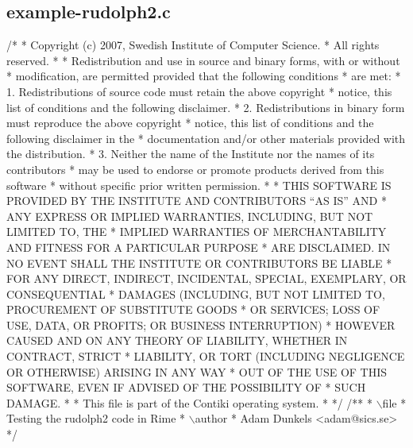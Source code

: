 \hypertarget{a00030}{}\subsection{example-\/rudolph2.\+c}

\begin{DoxyCodeInclude}
\textcolor{comment}{/*}
\textcolor{comment}{ * Copyright (c) 2007, Swedish Institute of Computer Science.}
\textcolor{comment}{ * All rights reserved.}
\textcolor{comment}{ *}
\textcolor{comment}{ * Redistribution and use in source and binary forms, with or without}
\textcolor{comment}{ * modification, are permitted provided that the following conditions}
\textcolor{comment}{ * are met:}
\textcolor{comment}{ * 1. Redistributions of source code must retain the above copyright}
\textcolor{comment}{ *    notice, this list of conditions and the following disclaimer.}
\textcolor{comment}{ * 2. Redistributions in binary form must reproduce the above copyright}
\textcolor{comment}{ *    notice, this list of conditions and the following disclaimer in the}
\textcolor{comment}{ *    documentation and/or other materials provided with the distribution.}
\textcolor{comment}{ * 3. Neither the name of the Institute nor the names of its contributors}
\textcolor{comment}{ *    may be used to endorse or promote products derived from this software}
\textcolor{comment}{ *    without specific prior written permission.}
\textcolor{comment}{ *}
\textcolor{comment}{ * THIS SOFTWARE IS PROVIDED BY THE INSTITUTE AND CONTRIBUTORS ``AS IS'' AND}
\textcolor{comment}{ * ANY EXPRESS OR IMPLIED WARRANTIES, INCLUDING, BUT NOT LIMITED TO, THE}
\textcolor{comment}{ * IMPLIED WARRANTIES OF MERCHANTABILITY AND FITNESS FOR A PARTICULAR PURPOSE}
\textcolor{comment}{ * ARE DISCLAIMED.  IN NO EVENT SHALL THE INSTITUTE OR CONTRIBUTORS BE LIABLE}
\textcolor{comment}{ * FOR ANY DIRECT, INDIRECT, INCIDENTAL, SPECIAL, EXEMPLARY, OR CONSEQUENTIAL}
\textcolor{comment}{ * DAMAGES (INCLUDING, BUT NOT LIMITED TO, PROCUREMENT OF SUBSTITUTE GOODS}
\textcolor{comment}{ * OR SERVICES; LOSS OF USE, DATA, OR PROFITS; OR BUSINESS INTERRUPTION)}
\textcolor{comment}{ * HOWEVER CAUSED AND ON ANY THEORY OF LIABILITY, WHETHER IN CONTRACT, STRICT}
\textcolor{comment}{ * LIABILITY, OR TORT (INCLUDING NEGLIGENCE OR OTHERWISE) ARISING IN ANY WAY}
\textcolor{comment}{ * OUT OF THE USE OF THIS SOFTWARE, EVEN IF ADVISED OF THE POSSIBILITY OF}
\textcolor{comment}{ * SUCH DAMAGE.}
\textcolor{comment}{ *}
\textcolor{comment}{ * This file is part of the Contiki operating system.}
\textcolor{comment}{ *}
\textcolor{comment}{ */}
\textcolor{comment}{}
\textcolor{comment}{/**}
\textcolor{comment}{ * \(\backslash\)file}
\textcolor{comment}{ *         Testing the rudolph2 code in Rime}
\textcolor{comment}{ * \(\backslash\)author}
\textcolor{comment}{ *         Adam Dunkels <adam@sics.se>}
\textcolor{comment}{ */}


\end{DoxyCodeInclude}
